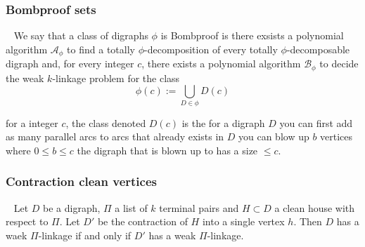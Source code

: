 \documentclass{beamer}
\begin{document}
\begin{frame}
\frametitle{Bombproof sets}
\begin{definition}~\cite{bangJGT85}
    We say that a class of digraphs $\phi$ is Bombproof is there exsists a polynomial algorithm $\mathcal{A}_{\phi}$ to find a totally $\phi$-decomposition of every totally $\phi$-decomposable digraph and, for every integer $c$, there exists a polynomial algorithm  $\mathcal{B}_{\phi}$ to decide the weak $k$-linkage problem for the class
    \begin{equation}
        \phi(c):=\bigcup_{D\in \phi}D(c) 
    \end{equation}
    \label{def:bombproof}
\end{definition}
for a integer $c$, the class denoted $D(c)$ is the for a digraph $D$ you can first add as many parallel arcs to arcs that already exists in $D$ you can blow up $b$ vertices where $0\leq b\leq c$ the digraph that is blown up to has a size $\leq c$. 
\end{frame}

\begin{frame}
    \frametitle{Contraction clean vertices}
    \begin{lemma}~\cite{bangJGT85}
        Let $D$ be a digraph, $\Pi$ a list of $k$ terminal pairs and $H\subset D$ a clean house with respect to $\Pi$. Let $D'$ be the contraction of $H$ into a single vertex $h$. Then $D$ has a waek $\Pi$-linkage if and only if $D'$ has a weak $\Pi$-linkage.  
        \label{lemma:cleanhouse}
    \end{lemma}
\end{frame}
\end{document}

